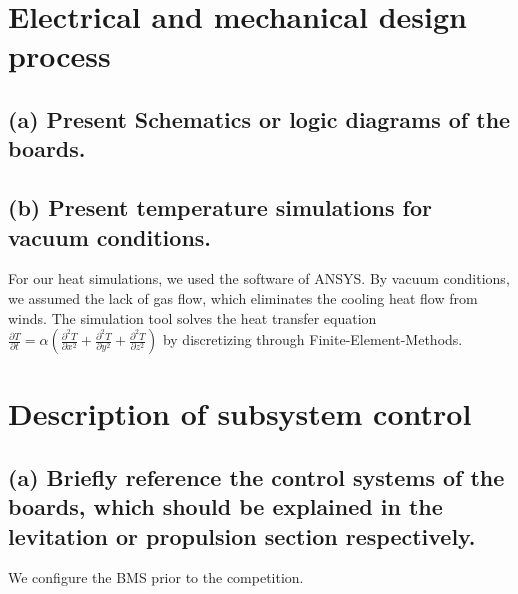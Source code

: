 \section{Electrical and mechanical design process}
\subsection{(a) Present Schematics or logic diagrams of the boards.}
\subsection{(b) Present temperature simulations for vacuum conditions.}
For our heat simulations, we used the software of ANSYS. By vacuum conditions, we assumed the
lack of gas flow, which eliminates the cooling heat flow from winds. The simulation tool solves
the heat transfer equation \( \frac{\partial T}{\partial t} = \alpha \left( \frac{\partial^2 T}{\partial x^2} + \frac{\partial^2 T}{\partial y^2} + \frac{\partial^2 T}{\partial z^2} \right) \)
by discretizing through Finite-Element-Methods.

\section{Description of subsystem control}
\subsection{(a) Briefly reference the control systems of the boards, which should be explained in the levitation or propulsion section respectively.}
We configure the BMS prior to the competition. \\


